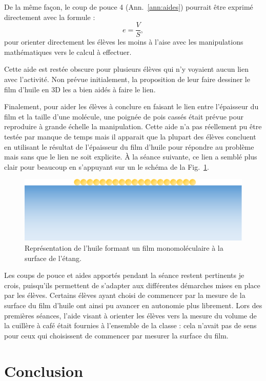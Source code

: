 \documentclass[12pt,a4paper, fleqn]{article}
\begin{document}
De la même façon, le coup de pouce 4 (Ann.~\ref{ann:aides}) pourrait être exprimé directement avec la formule :
\[e = \frac{V}{S}, \]
pour orienter directement les élèves les moins à l'aise avec les manipulations mathématiques vers le calcul à effectuer.

Cette aide est restée obscure pour plusieurs élèves qui n'y voyaient aucun lien avec l'activité.
Non prévue initialement, la proposition de leur faire dessiner le film d'huile en 3D les a bien aidés à faire le lien.

Finalement, pour aider les élèves à conclure en faisant le lien entre l'épaisseur du film et la taille d'une molécule, une poignée de pois cassés était prévue pour reproduire à grande échelle la manipulation.
Cette aide n'a pas réellement pu être testée par manque de temps mais il apparait que la plupart des élèves concluent en utilisant le résultat de l'épaisseur du film d'huile pour répondre au problème mais sans que le lien ne soit explicite.
À la séance suivante, ce lien a semblé plus clair pour beaucoup en s'appuyant sur un le schéma de la Fig.~\ref{fig:exp}.

\begin{figure}
\center
\includegraphics[scale=.25]{experience.png}
\caption{Représentation de l'huile formant un film monomoléculaire à la surface de l'étang.}
\label{fig:exp}
\end{figure}

Les coups de pouce et aides apportés pendant la séance restent pertinents je crois, puisqu'ils permettent de s'adapter aux différentes démarches mises en place par les élèves.
Certains élèves ayant choisi de commencer par la mesure de la surface du film d'huile ont ainsi pu avancer en autonomie plus librement.
Lors des premières séances, l'aide visant à orienter les élèves vers la mesure du volume de la cuillère à café était fournies à l'ensemble de la classe : cela n'avait pas de sens pour ceux qui choisissent de commencer par mesurer la surface du film.


\section*{Conclusion}
\end{document}
